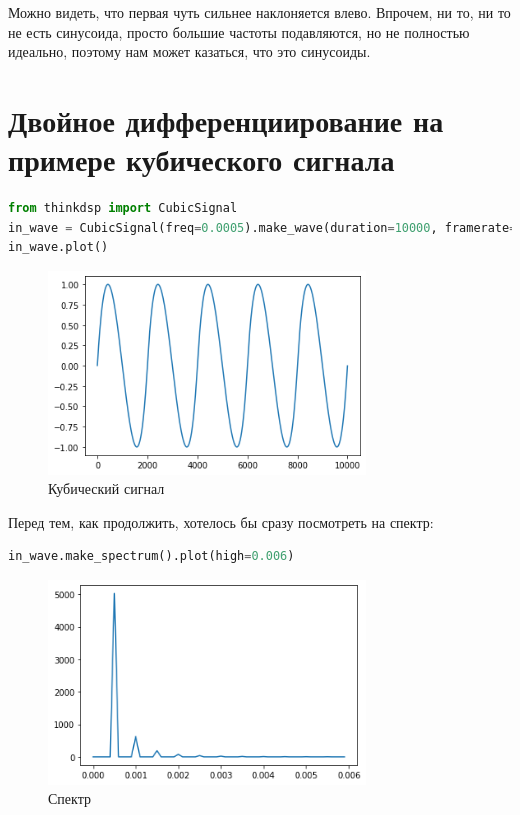 \documentclass[a4paper,12pt]{report}
\begin{document}
    Можно видеть, что первая чуть сильнее наклоняется влево. Впрочем, ни то, ни то не есть синусоида, просто большие частоты подавляются, но не полностью идеально, поэтому нам может казаться, что это синусоиды.
    
    \chapter{Двойное дифференциирование на примере кубического сигнала}
    
\begin{lstlisting}[language=Python,caption=Кубический сигнал]
from thinkdsp import CubicSignal
in_wave = CubicSignal(freq=0.0005).make_wave(duration=10000, framerate=1)
in_wave.plot()
\end{lstlisting}

    \begin{figure}[H]
        \centering
        \includegraphics[width=0.75\textwidth]{ex4_in_wave.png}
        \caption{Кубический сигнал}
        \label{fig:ex4_in_wave}
    \end{figure}

    Перед тем, как продолжить, хотелось бы сразу посмотреть на спектр:
    
\begin{lstlisting}[language=Python,caption=Спектр]
in_wave.make_spectrum().plot(high=0.006)
\end{lstlisting}

    \begin{figure}[H]
        \centering
        \includegraphics[width=0.75\textwidth]{ex4_in_wave_spectrum.png}
        \caption{Спектр}
        \label{fig:ex4_in_wave_spectrum}
    \end{figure}
\end{document}

